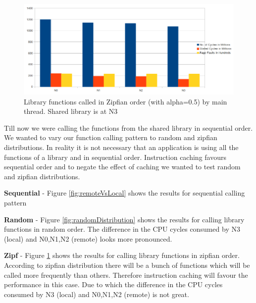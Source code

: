 \begin{figure}
    \centering
    \includegraphics[scale=0.35]{zipfDistribution.png}
    \caption{Library functions called in Zipfian order (with alpha=0.5) by main thread. Shared library is at N3 }
    \label{fig:zipfDistribution}
\end{figure}

Till now we were calling the functions from the shared library in sequential order.
We wanted to vary our function calling pattern to random and zipfian distributions.
In reality it is not necessary that an application is using all the functions of a library and in sequential order.
Instruction caching favours sequential order and to negate the effect of caching we wanted to test random and zipfian distributions.

\textbf{Sequential} - Figure \ref{fig:remoteVsLocal} shows the results for sequential calling pattern

\textbf{Random} - Figure \ref{fig:randomDistribution} shows the results for calling library functions in random order.
The difference in the CPU cycles consumed by N3 (local) and N0,N1,N2 (remote) looks more pronounced.

\textbf{Zipf} - Figure \ref{fig:zipfDistribution} shows the results for calling library functions in zipfian order.
According to zipfian distribution there will be a bunch of functions which will be called more frequently than others.
Therefore instruction caching will favour the performance in this case.
Due to which the difference in the CPU cycles consumed by N3 (local) and N0,N1,N2 (remote) is not great.



